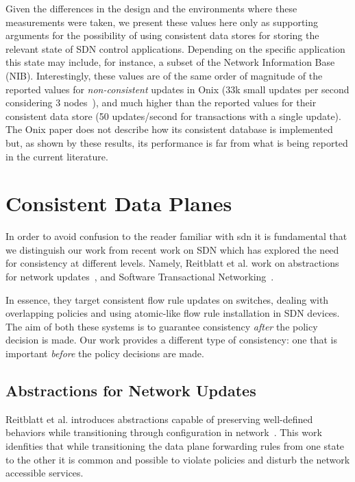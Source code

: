 Given the differences in the design and the environments where these measurements were taken, we present these values here only as supporting arguments for the possibility of using consistent data stores for storing the relevant state of SDN control applications.
Depending on the specific application this state may include, for instance, a subset of the Network Information Base (NIB).
Interestingly, these values are of the same order of magnitude of the reported values for \emph{non-consistent} updates in Onix (33k small updates per second considering 3 nodes~\cite{Koponen:2010th}), and much higher than the reported values for their consistent data store (50 updates/second for transactions with a single update).
The Onix paper does not describe how its consistent database is implemented but, as shown by these results, its performance is far from what is being reported in the current literature.

\glsresetall
\section{Consistent Data Planes}
\label{sec:related:consistent-data-plane}

In order to avoid confusion to the reader familiar with \gls{sdn} it is fundamental that we distinguish our work from recent work on SDN which has explored the need for consistency at different levels. 
Namely, Reitblatt et al. work on abstractions for network updates~\cite{reitblatt2012abstractions}, and Software Transactional Networking~\cite{Canini:2013:HotSDN:STN}. 

In essence, they target consistent flow rule updates on switches, dealing with overlapping policies and using atomic-like flow rule installation in SDN devices.
The aim of both these systems is to guarantee consistency \textit{after} the policy decision is made. 
Our work provides a different type of consistency: one that is important \emph{before} the policy decisions are made. 


\subsection{Abstractions for Network Updates}
Reitblatt et al. introduces abstractions capable of preserving well-defined behaviors while transitioning through configuration in network~\cite{reitblatt2012abstractions}. This work idenfities  that while transitioning the data plane forwarding rules from one state to the other it is common and possible to violate policies and disturb the network accessible  services. 

